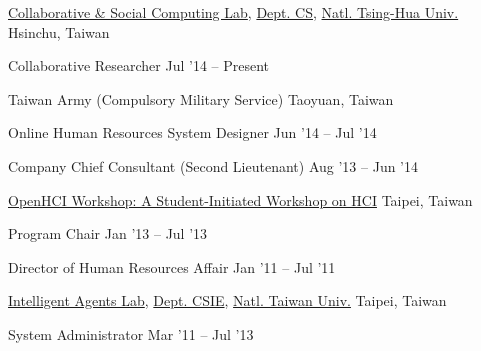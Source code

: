 \documentclass[10pt, a4paper]{article} %
\begin{document}

\headedsection
{\href{http://csclab.tw/}{Collaborative \& Social Computing Lab},
 \href{http://www.cs.nthu.edu.tw}{Dept. CS},
 \href{http://www.nthu.edu.tw}{Natl. Tsing-Hua Univ.}}
{Hsinchu, Taiwan}{

	\headedsubsection
	{Collaborative Researcher}
	{Jul '14 -- Present}
	{}
}


\headedsection
{Taiwan Army (Compulsory Military Service)}
{Taoyuan, Taiwan}{

	\headedsubsection
	{Online Human Resources System Designer}
	{Jun '14 -- Jul '14}
	{}

	\headedsubsection
	{Company Chief Consultant (Second Lieutenant)}
	{Aug '13 -- Jun '14}
	{}

}

\headedsection
{\href{http://www.openhci.com/}{OpenHCI Workshop: A Student-Initiated Workshop on HCI}}
{Taipei, Taiwan}{

	\headedsubsection
	{Program Chair}
	{Jan '13 -- Jul '13}
	{}

	\headedsubsection
	{Director of Human Resources Affair}
	{Jan '11 -- Jul '11}
	{}

}


\headedsection
{\href{http://agent.csie.ntu.edu.tw/}{Intelligent Agents Lab}, 
 \href{http://www.csie.ntu.edu.tw}{Dept. CSIE},
 \href{http://www.ntu.edu.tw}{Natl. Taiwan Univ.}}
{Taipei, Taiwan}{

	\headedsubsection
	{System Administrator}
	{Mar '11 -- Jul '13}
	{}

}
\end{document}
